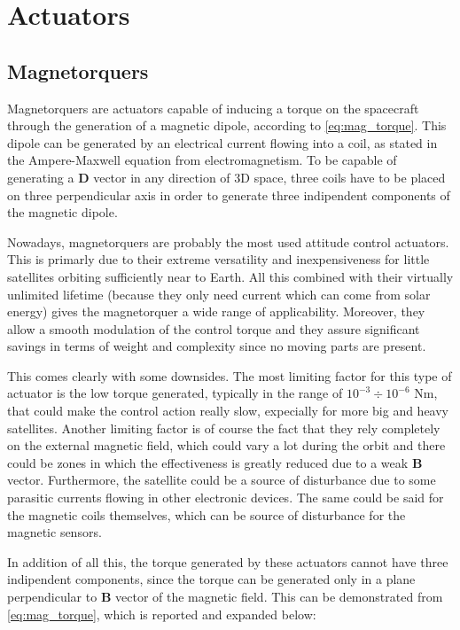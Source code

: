 \section{Actuators}
\label{sec:actuators}


\subsection{Magnetorquers}
\label{subsec:magnetorquers}

Magnetorquers are actuators capable of inducing a torque on the spacecraft through the generation of a magnetic dipole, according to \autoref{eq:mag_torque}. This dipole can be generated by an electrical current flowing into a coil, as stated in the Ampere-Maxwell equation from electromagnetism. To be capable of generating a $\boldsymbol{D}$ vector in any direction of 3D space, three coils have to be placed on three perpendicular axis in order to generate three indipendent components of the magnetic dipole.

Nowadays, magnetorquers are probably the most used attitude control actuators. This is primarly due to their extreme versatility and inexpensiveness for little satellites orbiting sufficiently near to Earth. All this combined with their virtually unlimited lifetime (because they only need current which can come from solar energy) gives the magnetorquer a wide range of applicability. Moreover, they allow a smooth modulation of the control torque and they assure significant savings in terms of weight and complexity since no moving parts are present.

This comes clearly with some downsides. The most limiting factor for this type of actuator is the low torque generated, typically in the range of $10^{-3} \div 10^{-6}$ Nm, that could make the control action really slow, expecially for more big and heavy satellites.
Another limiting factor is of course the fact that they rely completely on the external magnetic field, which could vary a lot during the orbit and there could be zones in which the effectiveness is greatly reduced due to a weak $\boldsymbol{B}$ vector. Furthermore, the satellite could be a source of disturbance due to some parasitic currents flowing in other electronic devices. The same could be said for the magnetic coils themselves, which can be source of disturbance for the magnetic sensors.

In addition of all this, the torque generated by these actuators cannot have three indipendent components, since the torque can be generated only in a plane perpendicular to $\boldsymbol{B}$ vector of the magnetic field. This can be demonstrated from \autoref{eq:mag_torque}, which is reported and expanded below:

